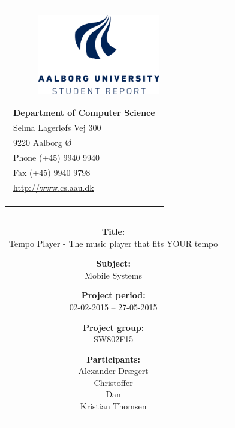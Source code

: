 \begin{nopagebreak}
	{\samepage 
		\begin{tabular}{r}
			\parbox{16cm}
			{\raisebox{11mm}
				{\includegraphics[height=3.5cm]{Content/TitlePage/aauIcon.png}}
				\hfill \parbox{8.5cm}{\vspace{-5cm}
				\begin{tabular}{l}
					{\small \textbf{Department of Computer Science}}\\
					{\small Selma Lagerløfs Vej 300} \\
					{\small 9220 Aalborg Ø} \\
					{\small Phone (+45) 9940 9940} \\
					{\small Fax (+45) 9940 9798} \\
					{\small \url{http://www.cs.aau.dk}}
				\end{tabular}}
			}
		\end{tabular}
		
		\begin{tabular}{cc}
			\parbox{7cm}{
				\begin{description}
					\item {\textbf{Title:}} \\
						Tempo Player - The music player that fits YOUR tempo\\
					
					\item {\textbf{Subject:}} \\
						Mobile Systems\\	
						
					\item {\textbf{Project period:}}\\
						  02-02-2015 -- 27-05-2015\\

					\item {\textbf{Project group:}}\\
						  SW802F15\\
			
					\item {\textbf{Participants:}}\\
						Alexander Drægert\\
						Christoffer\\
						Dan\\
						Kristian Thomsen \\
						  

\end{description}}
\end{tabular}}
\end{nopagebreak}
